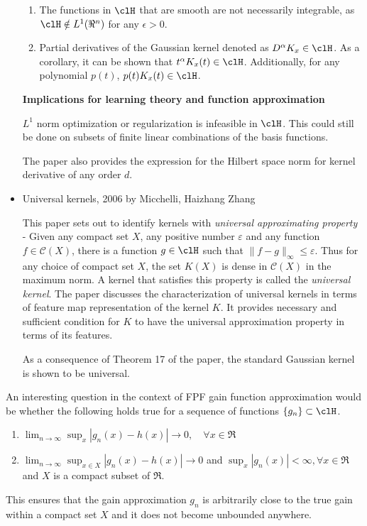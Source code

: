 \begin{itemize}
\begin{enumerate}
	\item The functions in $\clH$ that are smooth are not necessarily integrable, as $\clH \notin L^1(\Re^n)$ for any $\epsilon >0$. 
	

\item Partial derivatives of the Gaussian kernel denoted as $D^\alpha K_x \in \clH$. As a corollary, it can be shown that $t^\alpha K_x(t)\in\clH$. Additionally, for any polynomial $p(t)$, $p(t)K_x(t) \in \clH$. 

\end{enumerate}

\textbf{Implications for learning theory and function approximation}

$L^1$ norm optimization or regularization is infeasible in $\clH$. This could still be done on subsets of finite linear combinations of the basis functions.

The paper also provides the expression for the Hilbert space norm for kernel derivative of any order $d$. 


\item Universal kernels, 2006 by Micchelli, Haizhang Zhang

This paper sets out to identify kernels with \textit{universal approximating property} - Given any compact set $X$,  any positive number $\varepsilon$ and any function $f \in \mathcal{C}(X)$, there is a function $g \in \clH$ such that $\| f - g\|_{\infty} \leq \varepsilon$. Thus for any choice of compact set $X$, the set $K(X)$ is dense in $\mathcal{C}(X)$ in the maximum norm. A kernel that satisfies this property is called the \textit{universal kernel}. The paper discusses the characterization of universal kernels in terms of feature map representation of the kernel $K$. It provides necessary and sufficient condition for $K$ to have the universal approximation property in terms of its features. 

As a consequence of Theorem 17 of the paper, the standard Gaussian kernel is shown to be universal. 
\end{itemize}

An interesting question in the context of FPF gain function approximation would be whether the following holds true for a sequence of functions $\{g_n\} \subset \clH$.
\begin{enumerate}
\item $\lim_{n \to \infty} \sup_x |g_n(x) -h(x) | \to 0,\quad \forall x \in \Re$
\item $ \lim_{n \to \infty}\sup_{x \in X} |g_n(x) - h(x) | \to 0$ and $\sup_x |g_n(x)| < \infty,  \forall x \in \Re$ and $X$ is a compact subset of $\Re$. 
\end{enumerate}
This ensures that the gain approximation $g_n$ is arbitrarily close to the true gain within a compact set $X$ and it does not become unbounded anywhere. 


